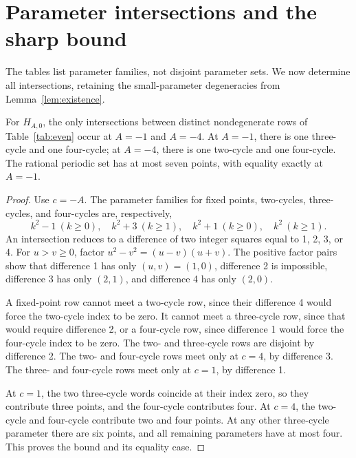 \section{Parameter intersections and the sharp bound}
\label{sec:sharp}

The tables list parameter families, not disjoint parameter sets. We now
determine all intersections, retaining the small-parameter degeneracies
from Lemma~\ref{lem:existence}.

\begin{proposition}
\label{prop:even_bound}
For \(H_{A,0}\), the only intersections between distinct
nondegenerate rows of Table~\ref{tab:even} occur at \(A=-1\) and
\(A=-4\). At \(A=-1\), there is one three-cycle and one four-cycle;
at \(A=-4\), there is one two-cycle and one four-cycle. The rational
periodic set has at most seven points, with equality exactly at
\(A=-1\).
\end{proposition}
\begin{proof}
Use \(c=-A\). The parameter families for fixed points, two-cycles,
three-cycles, and four-cycles are, respectively,
\[
 k^2-1\ (k\ge0),\quad k^2+3\ (k\ge1),\quad
 k^2+1\ (k\ge0),\quad k^2\ (k\ge1).
\]
An intersection reduces to a difference of two integer squares equal
to 1, 2, 3, or 4. For \(u>v\ge0\), factor
\(u^2-v^2=(u-v)(u+v)\). The positive factor pairs show that difference
1 has only \((u,v)=(1,0)\), difference 2 is impossible, difference
3 has only \((2,1)\), and difference 4 has only \((2,0)\).

A fixed-point row cannot meet a two-cycle row, since their difference
4 would force the two-cycle index to be zero. It cannot meet a
three-cycle row, since that would require difference 2, or a four-cycle
row, since difference 1 would force the four-cycle index to be zero.
The two- and three-cycle rows are disjoint by difference 2. The two-
and four-cycle rows meet only at \(c=4\), by difference 3. The three-
and four-cycle rows meet only at \(c=1\), by difference 1.

At \(c=1\), the two three-cycle words coincide at their index zero,
so they contribute three points, and the four-cycle contributes four.
At \(c=4\), the two-cycle and four-cycle contribute two and four
points. At any other three-cycle parameter there are six points, and
all remaining parameters have at most four. This proves the bound and
its equality case.
\end{proof}

